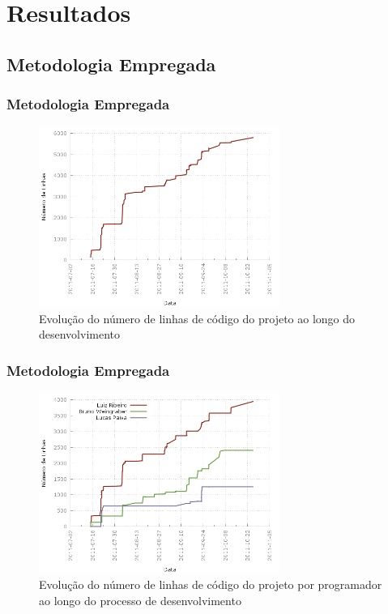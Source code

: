 \section{Resultados}

\subsection{Metodologia Empregada}
\frame
{
\frametitle{Metodologia Empregada}
\begin{figure}
\includegraphics[width=0.7\textwidth]{./imgs/lines_of_code.png}
\caption{Evolução do número de linhas de código do projeto ao longo do desenvolvimento}
\end{figure}
}

\frame
{
\frametitle{Metodologia Empregada}
\begin{figure}
\includegraphics[width=0.7\textwidth]{./imgs/lines_of_code_by_author.png}
\caption{Evolução do número de linhas de código do projeto por programador ao longo do processo de desenvolvimento}
\end{figure}
}

